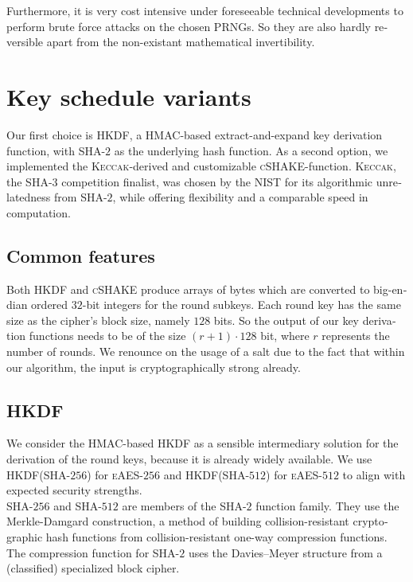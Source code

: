 \documentclass[a4paper,11pt]{article}
\begin{document}
\begin{otherlanguage}{english}
\noindent
Furthermore, it is very cost intensive under foreseeable technical developments to perform brute force attacks on the chosen PRNGs. So they are also hardly reversible apart from the non-existant mathematical invertibility.

\section{Key schedule variants}

\noindent
Our first choice is \textsc{HKDF}, a HMAC-based extract-and-expand key derivation function, with \textsc{SHA}-$2$ as the underlying hash function. As a second option, we implemented the \textsc{Keccak}-derived and customizable \textsc{cSHAKE}-function. \textsc{Keccak}, the \textsc{SHA}-$3$ competition finalist, was chosen by the NIST for its algorithmic unrelatedness from \textsc{SHA}-$2$, while offering flexibility and a comparable speed in computation. 

\subsection{Common features}
\noindent
Both \textsc{HKDF} and \textsc{cSHAKE} produce arrays of bytes which are converted to big-endian ordered $32$-bit integers for the round subkeys. Each round key has the same size as the cipher's block size, namely $128$ bits. So the output of our key derivation functions needs to be of the size $(r + 1)\cdot 128$ bit, where $r$ represents the number of rounds. We renounce on the usage of a salt due to the fact that within our algorithm, the input is cryptographically strong already.

\subsection{\textsc{HKDF}}
\noindent
We consider the \textsc{HMAC}-based \textsc{HKDF} as a sensible intermediary solution for the derivation of the round keys, because it is already widely available. We use \textsc{HKDF}(\textsc{SHA}-$256$) for \textsc{eAES}-$256$ and \textsc{HKDF}(\textsc{SHA}-$512$) for \textsc{eAES}-$512$ to align with expected security strengths. \\

\noindent
\textsc{SHA}-$256$ and \textsc{SHA}-$512$ are members of the \textsc{SHA}-$2$ function family. They use the Merkle-Damgard construction, a method of building collision-resistant cryptographic hash functions from collision-resistant one-way compression functions. The compression function for \textsc{SHA}-$2$ uses the Davies–Meyer structure from a (classified) specialized block cipher. \\ 


\end{otherlanguage}
\end{document}

